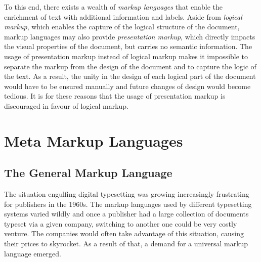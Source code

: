 \documentclass{book}
\begin{document}
      To this end, there exists a wealth of \emph{markup languages} that enable
      the enrichment of text with additional information and labels. Aside from
      \emph{logical markup}, which enables the capture of the logical structure
      of the document, markup languages may also provide \emph{presentation
      markup}, which directly impacts the visual properties of the document, but
      carries no semantic information. The usage of presentation markup instead
      of logical markup makes it impossible to separate the markup from the
      design of the document and to capture the logic of the text. As a result,
      the unity in the design of each logical part of the document would have to
      be ensured manually and future changes of design would become tedious. It
      is for these reasons that the usage of presentation markup is discouraged
      in favour of logical markup.

      \section{Meta Markup Languages}
      \subsection{The General Markup Language}
        The situation engulfing digital typesetting was growing increasingly
        frustrating for publishers in the 1960s. The markup languages used by
        different typesetting systems varied wildly and once a publisher had a
        large collection of documents typeset via a given company, switching to
        another one could be very costly venture. The companies would often take
        advantage of this situation, causing their prices to skyrocket. As a
        result of that, a demand for a universal markup language emerged.
\end{document}
